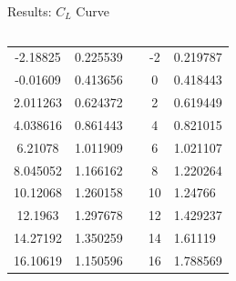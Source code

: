 \documentclass[english,10pt,a4paper,twoside]{beamer}
\begin{document}
\begin{frame}[shrink = 65]{Results: $C_L$ Curve}
\begin{columns}[T]
\begin{table}[H]
\begin{tabular}{|ccccl|}
				\multicolumn{1}{|c|}{-2.18825} & \multicolumn{1}{c|}{0.225539} & \multicolumn{1}{c|}{}          & \multicolumn{1}{c|}{-2}       & 0.219787                      \\ \cline{1-2} \cline{4-5} 
				\multicolumn{1}{|c|}{-0.01609} & \multicolumn{1}{c|}{0.413656} & \multicolumn{1}{c|}{}          & \multicolumn{1}{c|}{0}        & \multicolumn{1}{c|}{0.418443} \\ \cline{1-2} \cline{4-5} 
				\multicolumn{1}{|c|}{2.011263} & \multicolumn{1}{c|}{0.624372} & \multicolumn{1}{c|}{}          & \multicolumn{1}{c|}{2}        & 0.619449                      \\ \cline{1-2} \cline{4-5} 
				\multicolumn{1}{|c|}{4.038616} & \multicolumn{1}{c|}{0.861443} & \multicolumn{1}{c|}{}          & \multicolumn{1}{c|}{4}        & 0.821015                      \\ \cline{1-2} \cline{4-5} 
				\multicolumn{1}{|c|}{6.21078}  & \multicolumn{1}{c|}{1.011909} & \multicolumn{1}{c|}{}          & \multicolumn{1}{c|}{6}        & 1.021107                      \\ \cline{1-2} \cline{4-5} 
				\multicolumn{1}{|c|}{8.045052} & \multicolumn{1}{c|}{1.166162} & \multicolumn{1}{c|}{}          & \multicolumn{1}{c|}{8}        & 1.220264                      \\ \cline{1-2} \cline{4-5} 
				\multicolumn{1}{|c|}{10.12068} & \multicolumn{1}{c|}{1.260158} & \multicolumn{1}{c|}{}          & \multicolumn{1}{c|}{10}       & 1.24766                       \\ \cline{1-2} \cline{4-5} 
				\multicolumn{1}{|c|}{12.1963}  & \multicolumn{1}{c|}{1.297678} & \multicolumn{1}{c|}{}          & \multicolumn{1}{c|}{12}       & 1.429237                      \\ \cline{1-2} \cline{4-5} 
				\multicolumn{1}{|c|}{14.27192} & \multicolumn{1}{c|}{1.350259} & \multicolumn{1}{c|}{}          & \multicolumn{1}{c|}{14}       & 1.61119                       \\ \cline{1-2} \cline{4-5} 
				\multicolumn{1}{|c|}{16.10619} & \multicolumn{1}{c|}{1.150596} & \multicolumn{1}{c|}{}          & \multicolumn{1}{c|}{16}       & 1.788569                      \\ \cline{1-2} \cline{4-5} 
			\end{tabular}
		\end{table}
		

\end{columns}
\end{frame}
\end{document}

